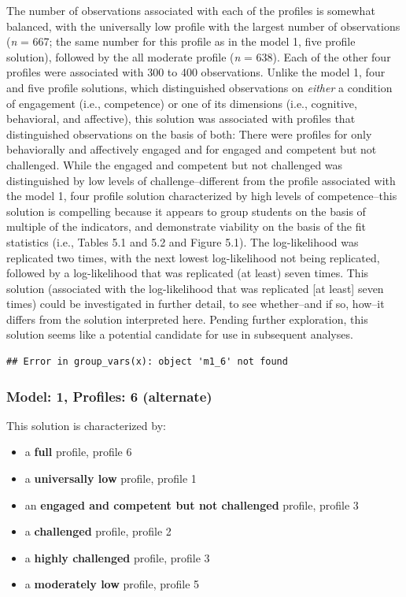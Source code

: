 \documentclass[]{book}
\providecommand{\tightlist}{%
  \setlength{\itemsep}{0pt}\setlength{\parskip}{0pt}}
\theoremstyle{definition}
\theoremstyle{definition}
\theoremstyle{definition}
\theoremstyle{remark}
\begin{document}
The number of observations associated with each of the profiles is
somewhat balanced, with the universally low profile with the largest
number of observations (\emph{n} = 667; the same number for this profile
as in the model 1, five profile solution), followed by the all moderate
profile (\emph{n} = 638). Each of the other four profiles were
associated with 300 to 400 observations. Unlike the model 1, four and
five profile solutions, which distinguished observations on
\emph{either} a condition of engagement (i.e., competence) or one of its
dimensions (i.e., cognitive, behavioral, and affective), this solution
was associated with profiles that distinguished observations on the
basis of both: There were profiles for only behaviorally and affectively
engaged and for engaged and competent but not challenged. While the
engaged and competent but not challenged was distinguished by low levels
of challenge--different from the profile associated with the model 1,
four profile solution characterized by high levels of competence--this
solution is compelling because it appears to group students on the basis
of multiple of the indicators, and demonstrate viability on the basis of
the fit statistics (i.e., Tables 5.1 and 5.2 and Figure 5.1). The
log-likelihood was replicated two times, with the next lowest
log-likelihood not being replicated, followed by a log-likelihood that
was replicated (at least) seven times. This solution (associated with
the log-likelihood that was replicated {[}at least{]} seven times) could
be investigated in further detail, to see whether--and if so, how--it
differs from the solution interpreted here. Pending further exploration,
this solution seems like a potential candidate for use in subsequent
analyses.

\begin{verbatim}
## Error in group_vars(x): object 'm1_6' not found
\end{verbatim}

\subsubsection{Model: 1, Profiles: 6
(alternate)}\label{model-1-profiles-6-alternate}

This solution is characterized by:

\begin{itemize}
\tightlist
\item
  a \textbf{full} profile, profile 6
\item
  a \textbf{universally low} profile, profile 1
\item
  an \textbf{engaged and competent but not challenged} profile, profile
  3
\item
  a \textbf{challenged} profile, profile 2
\item
  a \textbf{highly challenged} profile, profile 3
\item
  a \textbf{moderately low} profile, profile 5
\end{itemize}
\end{document}
